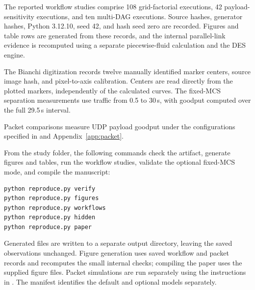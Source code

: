 The reported workflow studies comprise 108 grid-factorial executions,
42 payload-sensitivity executions, and ten multi-DAG executions.
Source hashes, generator hashes, Python 3.12.10, seed 42,
and hash seed zero are recorded. Figures and table rows are generated
from these records, and the internal parallel-link evidence is recomputed
using a separate piecewise-fluid calculation and the DES engine.

The Bianchi digitization records twelve manually identified marker centers,
source image hash, and pixel-to-axis calibration. Centers are read directly
from the plotted markers, independently of the calculated curves.
The fixed-MCS separation measurements use traffic from 0.5 to 30\,s,
with goodput computed over the full 29.5\,s interval.

Packet
comparisons measure UDP payload goodput under the configurations specified
in  and Appendix~\ref{app:packet}.

From the study folder, the following commands check the artifact, generate
figures and tables, run the workflow studies, validate the optional
fixed-MCS mode, and compile the manuscript:
\begin{lstlisting}[language=bash]
python reproduce.py verify
python reproduce.py figures
python reproduce.py workflows
python reproduce.py hidden
python reproduce.py paper
\end{lstlisting}
Generated files are written to a separate output directory, leaving the
saved observations unchanged. Figure generation uses saved workflow and
packet records and recomputes the small internal checks; compiling the
paper uses the supplied figure files. Packet simulations are run separately
using the instructions in . The manifest identifies the default
and optional models separately.

